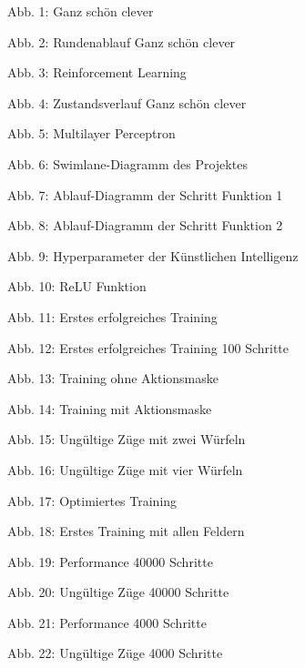 Abb. 1: Ganz schön clever 

Abb. 2: Rundenablauf Ganz schön clever

Abb. 3: Reinforcement Learning

Abb. 4: Zustandsverlauf Ganz schön clever

Abb. 5: Multilayer Perceptron

Abb. 6: Swimlane-Diagramm des Projektes

Abb. 7: Ablauf-Diagramm der Schritt Funktion 1

Abb. 8: Ablauf-Diagramm der Schritt Funktion 2

Abb. 9: Hyperparameter der Künstlichen Intelligenz

Abb. 10: ReLU Funktion

Abb. 11: Erstes erfolgreiches Training

Abb. 12: Erstes erfolgreiches Training 100 Schritte

Abb. 13: Training ohne Aktionsmaske

Abb. 14: Training mit Aktionsmaske

Abb. 15: Ungültige Züge mit zwei Würfeln

Abb. 16: Ungültige Züge mit vier Würfeln

Abb. 17: Optimiertes Training

Abb. 18: Erstes Training mit allen Feldern

Abb. 19: Performance 40000 Schritte

Abb. 20: Ungültige Züge 40000 Schritte

Abb. 21: Performance 4000 Schritte

Abb. 22: Ungültige Züge 4000 Schritte

